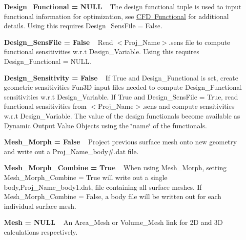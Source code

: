 \begin{DoxyItemize}
\item {\bfseries{ Design\+\_\+\+Functional = NULL}} ~\newline
 The design functional tuple is used to input functional information for optimization, see \mbox{\hyperlink{cfdDesignFunctional}{CFD Functional}} for additional details. Using this requires Design\+\_\+\+Sens\+File = False.
\item {\bfseries{ Design\+\_\+\+Sens\+File = False}} ~\newline
 Read $<$\+Proj\+\_\+\+Name$>$.sens file to compute functional sensitivities w.\+r.\+t Design\+\_\+\+Variable. Using this requires Design\+\_\+\+Functional = NULL.
\item {\bfseries{ Design\+\_\+\+Sensitivity = False}} ~\newline
 If True and Design\+\_\+\+Functional is set, create geometric sensitivities Fun3D input files needed to compute Design\+\_\+\+Functional sensitivities w.\+r.\+t Design\+\_\+\+Variable. If True and Design\+\_\+\+Sens\+File = True, read functional sensitivities from $<$\+Proj\+\_\+\+Name$>$.sens and compute sensitivities w.\+r.\+t Design\+\_\+\+Variable. The value of the design functionals become available as Dynamic Output Value Objects using the \char`\"{}name\char`\"{} of the functionals.
\item {\bfseries{ Mesh\+\_\+\+Morph = False}} ~\newline
 Project previous surface mesh onto new geometry and write out a \textquotesingle{}Proj\+\_\+\+Name\textquotesingle{}\+\_\+body\#.dat file.
\item {\bfseries{ Mesh\+\_\+\+Morph\+\_\+\+Combine = True}} ~\newline
 When using Mesh\+\_\+\+Morph, setting Mesh\+\_\+\+Morph\+\_\+\+Combine = True will write out a single body,\textquotesingle{}Proj\+\_\+\+Name\textquotesingle{}\+\_\+body1.\+dat, file containing all surface meshes. If Mesh\+\_\+\+Morph\+\_\+\+Combine = False, a body file will be written out for each individual surface mesh.
\item {\bfseries{Mesh = NULL}} ~\newline
 An Area\+\_\+\+Mesh or Volume\+\_\+\+Mesh link for 2D and 3D calculations respectively. 
\end{DoxyItemize}